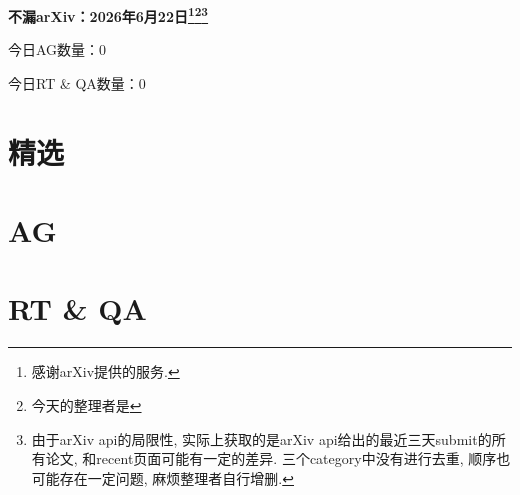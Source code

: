 \documentclass[9pt, a4paper]{article}
\theoremstyle{plain}
\theoremstyle{definition}
\theoremstyle{remark}
\newcommand{\AGnumber}{0}
\newcommand{\RTQAnumber}{0}
\newcommand{\NewestDate}{2026年6月22日}
\newcommand{\todayarXiver}{} %
\begin{document}
\begin{center}
    \Huge\textbf{不漏arXiv：\NewestDate\footnote{感谢arXiv提供的服务.}\footnote{今天的整理者是\todayarXiver}\footnote{由于arXiv api的局限性, 实际上获取的是arXiv api给出的最近三天submit的所有论文, 和recent页面可能有一定的差异. 三个category中没有进行去重, 顺序也可能存在一定问题, 麻烦整理者自行增删.}} \\
\end{center}

\setcounter{section}{-1}

\begin{center}
    今日AG数量：\AGnumber
    
    今日RT \& QA数量：\RTQAnumber
    
\end{center}


\section{精选}


\section{AG}

\section{RT \& QA}
\end{document}
